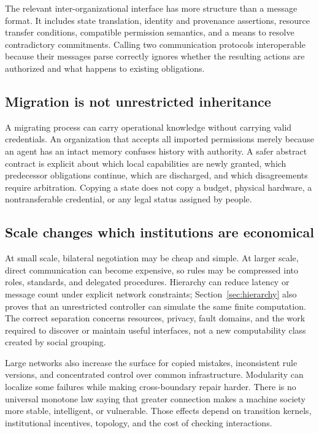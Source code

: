 \documentclass[11pt,letterpaper]{article}
\theoremstyle{plain}
\theoremstyle{definition}
\theoremstyle{remark}
\begin{document}
The relevant inter-organizational interface has more structure than a message format. It includes state translation, identity and provenance assertions, resource transfer conditions, compatible permission semantics, and a means to resolve contradictory commitments. Calling two communication protocols interoperable because their messages parse correctly ignores whether the resulting actions are authorized and what happens to existing obligations.

\subsection{Migration is not unrestricted inheritance}

A migrating process can carry operational knowledge without carrying valid credentials. An organization that accepts all imported permissions merely because an agent has an intact memory confuses history with authority. A safer abstract contract is explicit about which local capabilities are newly granted, which predecessor obligations continue, which are discharged, and which disagreements require arbitration. Copying a state does not copy a budget, physical hardware, a nontransferable credential, or any legal status assigned by people.

\subsection{Scale changes which institutions are economical}

At small scale, bilateral negotiation may be cheap and simple. At larger scale, direct communication can become expensive, so rules may be compressed into roles, standards, and delegated procedures. Hierarchy can reduce latency or message count under explicit network constraints; Section~\ref{sec:hierarchy} also proves that an unrestricted controller can simulate the same finite computation. The correct separation concerns resources, privacy, fault domains, and the work required to discover or maintain useful interfaces, not a new computability class created by social grouping.

Large networks also increase the surface for copied mistakes, inconsistent rule versions, and concentrated control over common infrastructure. Modularity can localize some failures while making cross-boundary repair harder. There is no universal monotone law saying that greater connection makes a machine society more stable, intelligent, or vulnerable. Those effects depend on transition kernels, institutional incentives, topology, and the cost of checking interactions.
\end{document}
